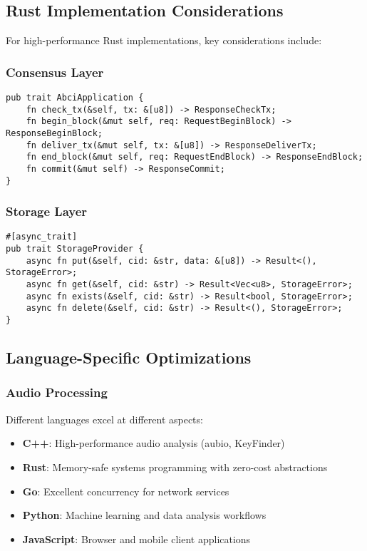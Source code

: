 \documentclass[11pt,a4paper]{article}
\begin{document}
\subsection{Rust Implementation Considerations}

For high-performance Rust implementations, key considerations include:

\subsubsection{Consensus Layer}
\begin{lstlisting}[caption=Rust ABCI Trait Definition]
pub trait AbciApplication {
    fn check_tx(&self, tx: &[u8]) -> ResponseCheckTx;
    fn begin_block(&mut self, req: RequestBeginBlock) -> ResponseBeginBlock;
    fn deliver_tx(&mut self, tx: &[u8]) -> ResponseDeliverTx;
    fn end_block(&mut self, req: RequestEndBlock) -> ResponseEndBlock;
    fn commit(&mut self) -> ResponseCommit;
}
\end{lstlisting}

\subsubsection{Storage Layer}
\begin{lstlisting}[caption=Rust Storage Interface]
#[async_trait]
pub trait StorageProvider {
    async fn put(&self, cid: &str, data: &[u8]) -> Result<(), StorageError>;
    async fn get(&self, cid: &str) -> Result<Vec<u8>, StorageError>;
    async fn exists(&self, cid: &str) -> Result<bool, StorageError>;
    async fn delete(&self, cid: &str) -> Result<(), StorageError>;
}
\end{lstlisting}

\subsection{Language-Specific Optimizations}

\subsubsection{Audio Processing}
Different languages excel at different aspects:

\begin{itemize}
  \item \textbf{C++}: High-performance audio analysis (aubio, KeyFinder)
  \item \textbf{Rust}: Memory-safe systems programming with zero-cost abstractions
  \item \textbf{Go}: Excellent concurrency for network services
  \item \textbf{Python}: Machine learning and data analysis workflows
  \item \textbf{JavaScript}: Browser and mobile client applications
\end{itemize}
\end{document}
